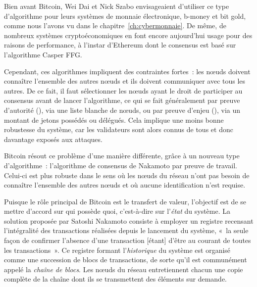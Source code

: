 Bien avant Bitcoin, Wei Dai et Nick Szabo envisageaient d'utiliser ce type d'algorithme pour leurs systèmes de monnaie électronique, b-money et bit gold, comme nous l'avons vu dans le chapitre~\ref{ch:cybermonnaie}. De même, de nombreux systèmes cryptoéconomiques en font encore aujourd'hui usage pour des raisons de performance, à l'instar d'Ethereum dont le consensus est basé sur l'algorithme Casper FFG.

Cependant, ces algorithmes impliquent des contraintes fortes~: les nœuds doivent connaître l'ensemble des autres nœuds et ils doivent communiquer avec tous les autres. De ce fait, il faut sélectionner les nœuds ayant le droit de participer au consensus avant de lancer l'algorithme, ce qui se fait généralement par preuve d'autorité (), via une liste blanche de nœuds, ou par preuve d'enjeu (), via un montant de jetons possédés ou délégués. Cela implique une moins bonne robustesse du système, car les validateurs sont alors connus de tous et donc davantage exposés aux attaques.



Bitcoin résout ce problème d'une manière différente, grâce à un nouveau type d'algorithme~: l'algorithme de consensus de Nakamoto par preuve de travail. Celui-ci est plus robuste dans le sens où les nœuds du réseau n'ont pas besoin de connaître l'ensemble des autres nœuds et où aucune identification n'est requise.

Puisque le rôle principal de Bitcoin est le transfert de valeur, l'objectif est de se mettre d'accord sur qui possède quoi, c'est-à-dire sur l'\emph{état} du système. La solution proposée par Satoshi Nakamoto consiste à employer un registre recensant l'intégralité des transactions réalisées depuis le lancement du système, «~la seule façon de confirmer l'absence d'une transaction [étant] d'être au courant de toutes les transactions~». Ce registre formant l'\emph{historique} du système est organisé comme une succession de blocs de transactions, de sorte qu'il est communément appelé la \emph{chaîne de blocs}. Les nœuds du réseau entretiennent chacun une copie complète de la chaîne dont ils se transmettent des éléments sur demande.


